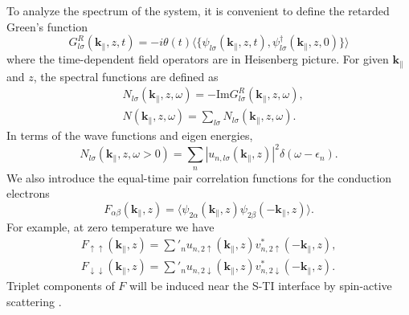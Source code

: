 \documentclass[11pt]{report}
\newcommand{\kperp}{\mathbf{k}_\parallel}
\begin{document}
To analyze the spectrum of the system, it is convenient to define the retarded Green's function
\begin{equation}
G^R_{l\sigma}(\mathbf{k}_\parallel,z,t)=-i\theta(t)\langle \{\psi_{l\sigma}(\mathbf{k}_\parallel,z,t),
\psi^\dagger_{l\sigma}(\mathbf{k}_\parallel,z,0)\}\rangle
\end{equation}
where the time-dependent field operators are in Heisenberg picture. 
For given $\kperp$ and $z$, the spectral functions 
are defined as
\begin{align}
&N_{l\sigma}(\mathbf{k}_\parallel,z,\omega)= -\mathrm{Im}G^R_{l\sigma}(\mathbf{k}_\parallel,z,\omega), \\
&N(\mathbf{k}_\parallel,z,\omega)=\sum_{l\sigma}N_{l\sigma}(\mathbf{k}_\parallel,z,\omega).
\end{align}
In terms of the wave functions and eigen energies, 
\begin{equation}
N_{l\sigma}(\mathbf{k}_\parallel,z,\omega>0)=\sum_n|u_{n,l\sigma}(\mathbf{k}_\parallel,z)|^2\delta(\omega-\epsilon_n). 
\end{equation}
We also introduce the equal-time pair correlation functions
for the conduction electrons 
\begin{equation}
F_{\alpha\beta}(\mathbf{k}_\parallel,z)=\langle \psi_{2\alpha}(\mathbf{k}_\parallel,z) \psi_{2\beta}(-\mathbf{k}_\parallel,z)\rangle.\label{pair-corr}
\end{equation}
For example, at zero temperature we have
\begin{align}
F_{\uparrow\uparrow}(\mathbf{k}_\parallel,z)=\sum'_n u_{n,2\uparrow}(\mathbf{k}_\parallel,z)
v^*_{n,2\uparrow}(-\mathbf{k}_\parallel,z),\\
F_{\downarrow\downarrow}(\mathbf{k}_\parallel,z)=\sum'_n u_{n,2\downarrow}(\mathbf{k}_\parallel,z)
v^*_{n,2\downarrow}(-\mathbf{k}_\parallel,z).
\end{align}
Triplet components of $F$ will be induced near the S-TI interface by spin-active
scattering \cite{zhao}.

\end{document}
